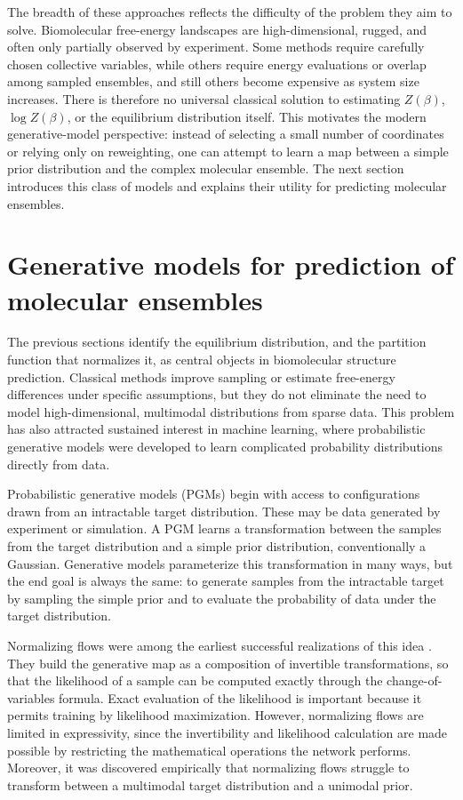 The breadth of these approaches reflects the difficulty of the problem they aim to solve. Biomolecular free-energy landscapes are high-dimensional, rugged, and often only partially observed by experiment. Some methods require carefully chosen collective variables, while others require energy evaluations or overlap among sampled ensembles, and still others become expensive as system size increases. There is therefore no universal classical solution to estimating $Z(\beta)$, $\log Z(\beta)$, or the equilibrium distribution itself. This motivates the modern generative-model perspective: instead of selecting a small number of coordinates or relying only on reweighting, one can attempt to learn a map between a simple prior distribution and the complex molecular ensemble. The next section introduces this class of models and explains their utility for predicting molecular ensembles.

\section{Generative models for prediction of molecular ensembles}
\label{ch1:sec:generative-models}

The previous sections identify the equilibrium distribution, and the partition function that normalizes it, as central objects in biomolecular structure prediction. Classical methods improve sampling or estimate free-energy differences under specific assumptions, but they do not eliminate the need to model high-dimensional, multimodal distributions from sparse data. This problem has also attracted sustained interest in machine learning, where probabilistic generative models were developed to learn complicated probability distributions directly from data.

Probabilistic generative models (PGMs) begin with access to configurations drawn from an intractable target distribution. These may be data generated by experiment or simulation. A PGM learns a transformation between the samples from the target distribution and a simple prior distribution, conventionally a Gaussian. Generative models parameterize this transformation in many ways, but the end goal is always the same: to generate samples from the intractable target by sampling the simple prior and to evaluate the probability of data under the target distribution.

Normalizing flows were among the earliest successful realizations of this idea \citep{Dinh2017RealNVP}. They build the generative map as a composition of invertible transformations, so that the likelihood of a sample can be computed exactly through the change-of-variables formula. Exact evaluation of the likelihood is important because it permits training by likelihood maximization. However, normalizing flows are limited in expressivity, since the invertibility and likelihood calculation are made possible by restricting the mathematical operations the network performs. Moreover, it was discovered empirically that normalizing flows struggle to transform between a multimodal target distribution and a unimodal prior.

